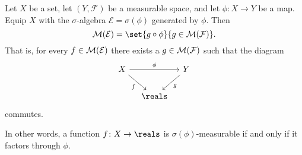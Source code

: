 \documentclass[article, a4paper, 11pt, oneside]{memoir}
\numberwithin{equation}{chapter}
\newcommand{\calE}{\mathcal{E}}
\newcommand{\calF}{\mathcal{F}}
\begin{document}
\begin{proposition}
    Let $X$ be a set, let $(Y,\calF)$ be a measurable space, and let $\phi \colon X \to Y$ be a map. Equip $X$ with the $\sigma$-algebra $\calE = \sigma(\phi)$ generated by $\phi$. Then
    \begin{equation}
        \label{eq:factorisation-lemma}
        \meas{\calE}
            = \set{g \circ \phi}{g \in \meas{\calF}}.
    \end{equation}
    That is, for every $f \in \meas{\calE}$ there exists a $g \in \meas{\calF}$ such that the diagram
    \begin{equation*}
        \begin{tikzcd}[column sep=1em]
            X
                \ar[rr, "\phi"]
                \ar[dr, "f", swap]
            && Y
                \ar[dl, "g"] \\
            & \reals
        \end{tikzcd}
    \end{equation*}
    commutes.
\end{proposition}
%
In other words, a function $f \colon X \to \reals$ is $\sigma(\phi)$-measurable if and only if it factors through $\phi$.
\end{document}

